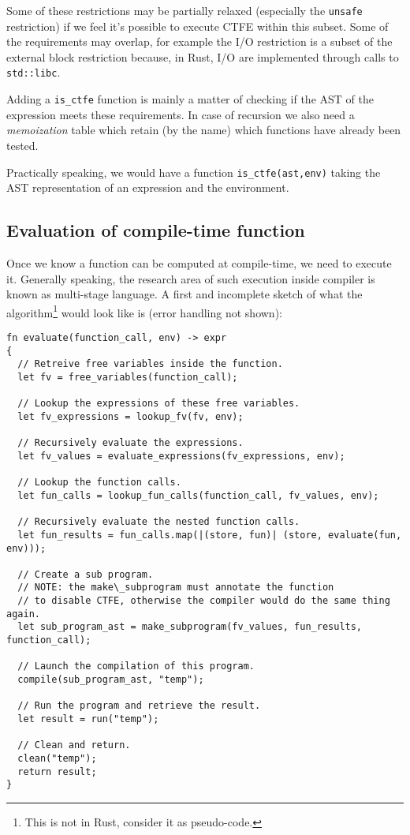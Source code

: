 \documentclass[a4paper,11pt]{article}
\begin{document}
Some of these restrictions may be partially relaxed (especially the \lstinline{unsafe} restriction) if we feel it's possible to execute CTFE within this subset. Some of the requirements may overlap, for example the I/O restriction is a subset of the external block restriction because, in Rust, I/O are implemented through calls to \lstinline{std::libc}.

Adding a \lstinline{is_ctfe} function is mainly a matter of checking if the AST of the expression meets these requirements. In case of recursion we also need a \textit{memoization} table which retain (by the name) which functions have already been tested.

Practically speaking, we would have a function \lstinline{is_ctfe(ast,env)} taking the AST representation of an expression and the environment.

\subsection{Evaluation of compile-time function}
\label{ctfe-evaluation}

Once we know a function can be computed at compile-time, we need to execute it. Generally speaking, the research area of such execution inside compiler is known as multi-stage language\cite{DBLP:conf/gpce/CalcagnoTHL03,DBLP:conf/dagstuhl/Taha03}. A first and incomplete sketch of what the algorithm\footnote{This is not in Rust, consider it as pseudo-code.} would look like is (error handling not shown):

\begin{lstlisting}
fn evaluate(function_call, env) -> expr
{
  // Retreive free variables inside the function.
  let fv = free_variables(function_call);

  // Lookup the expressions of these free variables.
  let fv_expressions = lookup_fv(fv, env);

  // Recursively evaluate the expressions.
  let fv_values = evaluate_expressions(fv_expressions, env);

  // Lookup the function calls.
  let fun_calls = lookup_fun_calls(function_call, fv_values, env);

  // Recursively evaluate the nested function calls.
  let fun_results = fun_calls.map(|(store, fun)| (store, evaluate(fun, env)));

  // Create a sub program.
  // NOTE: the make\_subprogram must annotate the function
  // to disable CTFE, otherwise the compiler would do the same thing again.
  let sub_program_ast = make_subprogram(fv_values, fun_results, function_call);

  // Launch the compilation of this program.
  compile(sub_program_ast, "temp");

  // Run the program and retrieve the result.
  let result = run("temp");

  // Clean and return.
  clean("temp");
  return result;
}
\end{lstlisting}
\end{document}
